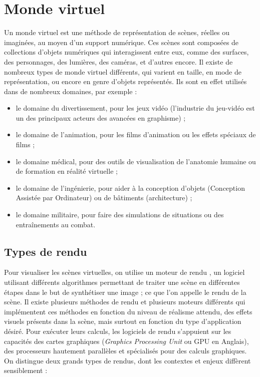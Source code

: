\section{Monde virtuel}

Un monde virtuel est une méthode de représentation de scènes, réelles ou imaginées, au moyen d'un support numérique. Ces scènes sont composées de collections d'objets numériques qui interagissent entre eux, comme des surfaces, des personnages, des lumières, des caméras, et d'autres encore. Il existe de nombreux types de monde virtuel différents, qui varient en taille, en mode de représentation, ou encore en genre d'objets représentés. Ils sont en effet utilisés dans de nombreux domaines, par exemple :

\begin{itemize}
    \item le domaine du divertissement, pour les jeux vidéo (l'industrie du jeu-vidéo est un des principaux acteurs des avancées en graphisme) ;
    \item le domaine de l'animation, pour les films d'animation ou les effets spéciaux de films ;
    \item le domaine médical, pour des outils de visualisation de l'anatomie humaine ou de formation en réalité virtuelle ;
    \item le domaine de l'ingénierie, pour aider à la conception d'objets (Conception Assistée par Ordinateur) ou de bâtiments (architecture) ;
    \item le domaine militaire, pour faire des simulations de situations ou des entraînements au combat.
\end{itemize}

\subsection*{Types de rendu}

Pour visualiser les scènes virtuelles, on utilise un \og moteur de rendu \fg , un logiciel utilisant différents algorithmes permettant de traiter une scène en différentes étapes dans le but de synthétiser une image ; ce que l'on appelle le rendu de la scène. Il existe plusieurs méthodes de rendu et plusieurs moteurs différents qui implémentent ces méthodes en fonction du niveau de réalisme attendu, des effets visuels présents dans la scène, mais surtout en fonction du type d'application désiré. Pour exécuter leurs calculs, les logiciels de rendu s'appuient sur les capacités des cartes graphiques ({\it Graphics Processing Unit} ou GPU en Anglais), des processeurs hautement parallèles et spécialisés pour des calculs graphiques. On distingue deux grands types de rendus, dont les contextes et enjeux diffèrent sensiblement :

